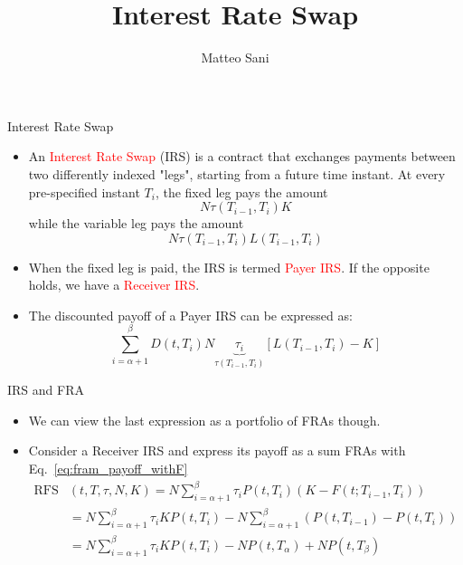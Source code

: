 \documentclass{beamer}
\title{Interest Rate Swap}
\author{Matteo Sani}
\begin{document}
	\begin{frame}[plain]
		\maketitle
	\end{frame}
	

\begin{frame}{Interest Rate Swap}
	\begin{itemize}
		\item An \textcolor{red}{Interest Rate Swap} (IRS) is a contract that exchanges payments between two differently indexed "legs", starting from a future time instant. At every pre-specified instant $T_i$, the fixed leg pays the amount
		\begin{equation*}
			N\tau(T_{i-1}, T_i)K
		\end{equation*}
		while the variable leg pays the amount
		\begin{equation*}
			N\tau(T_{i-1}, T_i)L(T_{i-1}, T_i)
		\end{equation*}
		\item When the fixed leg is paid, the IRS is termed \textcolor{red}{Payer IRS}. If the opposite holds, we have a \textcolor{red}{Receiver IRS}.
		\item The discounted payoff of a Payer IRS can be expressed as:
		\begin{equation}
			\sum_{i=\alpha+1}^{\beta} D(t,T_i)N \underbrace{\tau_i}_{\tau(T_{i-1},T_i)}
			\left[L(T_{i-1},T_i)-K\right]
		\end{equation}	
	\end{itemize}
	
\end{frame}

\begin{frame}{IRS and FRA}
	\begin{itemize}
		\item We can view the last expression as a portfolio of FRAs though.
		\item Consider a Receiver IRS and express its payoff as a sum FRAs with Eq.~\ref{eq:fram_payoff_withF}
		\begin{equation}
			\begin{aligned}
				\text{RFS}&(t,T,\tau,N,K) =N\sum_{i=\alpha+1}^{\beta}\tau_i P(t,T_i)(K-F(t;T_{i-1},T_i))\\
				&=N\sum_{i=\alpha+1}^{\beta}\tau_i KP(t,T_i)-N\sum_{i=\alpha+1}^{\beta}(P(t,T_{i-1})-P(t,T_i)) \\
				&=N\sum_{i=\alpha+1}^{\beta}\tau_i KP(t,T_i)-NP(t,T_\alpha)+NP(t,T_\beta)
			\end{aligned}
		\end{equation}
	\end{itemize}
\end{frame}
\end{document}
